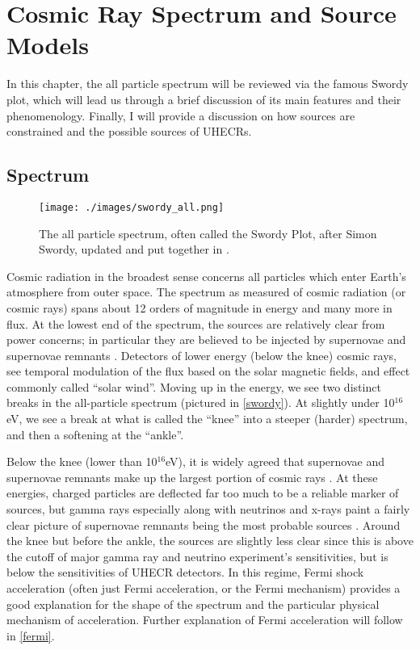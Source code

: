 
\chapter{Cosmic Ray Spectrum and Source Models}
In this chapter, the all particle spectrum will be reviewed via the famous Swordy plot, which will lead us through a brief discussion of its main features and their phenomenology. Finally, I will provide a discussion on how sources are constrained and the possible sources of UHECRs.
\section{Spectrum}

\begin{figure}
\begin{center}
\texttt{[image: ./images/swordy\_all.png]}
\caption{The all particle spectrum, often called the Swordy Plot, after Simon Swordy, updated and put together in \cite{swordyplot}.}
\label{swordy}
\end{center}
\end{figure}


Cosmic radiation in the broadest sense concerns all particles which enter Earth's atmosphere from outer space. The spectrum as measured of cosmic radiation (or cosmic rays) spans about 12 orders of magnitude in energy and many more in flux. At the lowest end of the spectrum, the sources are relatively clear from power concerns; in particular they are believed to be injected by supernovae and supernovae remnants \cite{stanev}. Detectors of lower energy (below the knee) cosmic rays, see temporal modulation of the flux based on the solar magnetic fields, and effect commonly called ``solar wind''. Moving up in the energy, we see two distinct breaks in the all-particle spectrum (pictured in \autoref{swordy}). At slightly under 10$^{16}$eV, we see a break at what is called the ``knee'' into a steeper (harder) spectrum, and then a softening at the ``ankle''. 

Below the knee (lower than 10$^{16}$eV), it is widely agreed that supernovae and supernovae remnants make up the largest portion of cosmic rays \cite{stanev, crapp}. At these energies, charged particles are deflected far too much to be a reliable marker of sources, but gamma rays especially along with neutrinos and x-rays paint a fairly clear picture of supernovae remnants being the most probable sources \cite{stanev, sean, foteini}. Around the knee but before the ankle, the sources are slightly less clear since this is above the cutoff of major gamma ray and neutrino experiment's sensitivities, but is below the sensitivities of UHECR detectors. In this regime, Fermi shock acceleration (often just Fermi acceleration, or the Fermi mechanism) provides a good explanation for the shape of the spectrum and the particular physical mechanism of acceleration. Further explanation of Fermi acceleration will follow in \autoref{fermi}.


